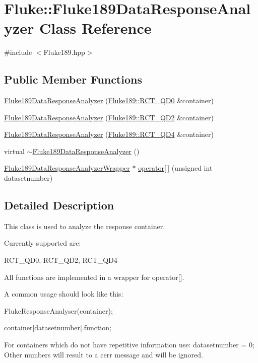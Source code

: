 \hypertarget{classFluke_1_1Fluke189DataResponseAnalyzer}{
\section{Fluke::Fluke189DataResponseAnalyzer Class Reference}
\label{classFluke_1_1Fluke189DataResponseAnalyzer}
}


{\ttfamily \#include $<$Fluke189.hpp$>$}\subsection*{Public Member Functions}
\begin{DoxyCompactItemize}
\item 
\hyperlink{classFluke_1_1Fluke189DataResponseAnalyzer_a37d9cf81e6d7eee9ea5cf3cd77306dad}{Fluke189DataResponseAnalyzer} (\hyperlink{classFluke_1_1Fluke189_a9a5b405bb506cd2482de2f8bb0bea189}{Fluke189::RCT\_\-QD0} \&container)
\item 
\hyperlink{classFluke_1_1Fluke189DataResponseAnalyzer_a7dd45e9e69f5dbc486c619e33275af58}{Fluke189DataResponseAnalyzer} (\hyperlink{classFluke_1_1Fluke189_a6dcb8bdb7e09aba26dd95d49f56690cf}{Fluke189::RCT\_\-QD2} \&container)
\item 
\hyperlink{classFluke_1_1Fluke189DataResponseAnalyzer_a2501e803c1b0f92dee5d1c1249be62bc}{Fluke189DataResponseAnalyzer} (\hyperlink{classFluke_1_1Fluke189_a82ebb2c4106833e320c8b18b968a5e22}{Fluke189::RCT\_\-QD4} \&container)
\item 
virtual \hyperlink{classFluke_1_1Fluke189DataResponseAnalyzer_a8340ad62d9d5f3364482064eea967cef}{$\sim$Fluke189DataResponseAnalyzer} ()
\item 
\hyperlink{classFluke_1_1Fluke189DataResponseAnalyzerWrapper}{Fluke189DataResponseAnalyzerWrapper} $\ast$ \hyperlink{classFluke_1_1Fluke189DataResponseAnalyzer_ac946623b6b04e9ddb858a1d20fc753da}{operator\mbox{[}$\,$\mbox{]}} (unsigned int datasetnumber)
\end{DoxyCompactItemize}


\subsection{Detailed Description}
This class is used to analyze the response container. \par
 Currently supported are: \par
 RCT\_\-QD0, RCT\_\-QD2, RCT\_\-QD4 \par
 All functions are implemented in a wrapper for operator\mbox{[}\mbox{]}.\par
 \par
 A common usage should look like this:\par
 FlukeResponseAnalyser(container); \par
 container\mbox{[}datasetnumber\mbox{]}.function;\par
 For containers which do not have repetitive information use: datasetnumber = 0; Other numbers will result to a cerr message and will be ignored.


